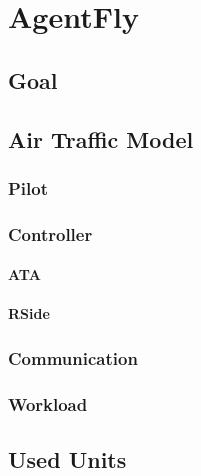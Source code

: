 \chapter{AgentFly}

\section{Goal}

\section{Air Traffic Model}
\subsection{Pilot}
\subsection{Controller}
\subsubsection{ATA}
\subsubsection{RSide}
\subsection{Communication}
\subsection{Workload}

\section{Used Units}
